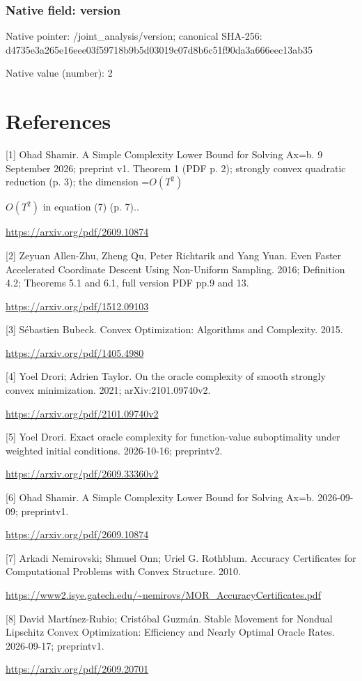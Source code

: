 \documentclass[10pt,a4paper]{article}
\newcommand{\AtlasMath}[1]{\par\begingroup\centering\setbox0=\hbox{$\displaystyle #1$}\ifdim\wd0>1.4\linewidth\typeout{ATLAS WIDE FORMULA: \the\wd0}\fi\ifdim\wd0>\linewidth\resizebox{\linewidth}{!}{\box0}\else\box0\fi\par\endgroup}
\newcommand{\AtlasInlineMath}[1]{\begingroup\setbox0=\hbox{$#1$}\ifdim\wd0>.4\linewidth\endgroup\AtlasMath{#1}\else\endgroup$#1$\fi}
\begin{document}
\subsubsection{Native field: version}
Native pointer: /joint\_\allowbreak{}analysis/version; canonical SHA-256: d4735e3a265e16eee03f59718b9b5d03019c07d8b6c51f90da3a666eec13ab35

Native value (number): 2

\section{References}
[1] Ohad Shamir. A Simple Complexity Lower Bound for Solving Ax=b. 9 September 2026; preprint v1. Theorem 1 (PDF p. 2); strongly convex quadratic reduction (p. 3); the dimension \AtlasInlineMath{O(T^2)} in equation (7) (p. 7)..

\url{https://arxiv.org/pdf/2609.10874}

[2] Zeyuan Allen-Zhu, Zheng Qu, Peter Richtarik and Yang Yuan. Even Faster Accelerated Coordinate Descent Using Non-Uniform Sampling. 2016; Definition 4.2; Theorems 5.1 and 6.1, full version PDF pp.9 and 13.

\url{https://arxiv.org/pdf/1512.09103}

[3] Sébastien Bubeck. Convex Optimization: Algorithms and Complexity. 2015.

\url{https://arxiv.org/pdf/1405.4980}

[4] Yoel Drori; Adrien Taylor. On the oracle complexity of smooth strongly convex minimization. 2021; arXiv:2101.09740v2.

\url{https://arxiv.org/pdf/2101.09740v2}

[5] Yoel Drori. Exact oracle complexity for function-value suboptimality under weighted initial conditions. 2026-10-16; preprintv2.

\url{https://arxiv.org/pdf/2609.33360v2}

[6] Ohad Shamir. A Simple Complexity Lower Bound for Solving Ax=b. 2026-09-09; preprintv1.

\url{https://arxiv.org/pdf/2609.10874}

[7] Arkadi Nemirovski; Shmuel Onn; Uriel G. Rothblum. Accuracy Certificates for Computational Problems with Convex Structure. 2010.

\url{https://www2.isye.gatech.edu/~nemirovs/MOR_AccuracyCertificates.pdf}

[8] David Martínez-Rubio; Cristóbal Guzmán. Stable Movement for Nondual Lipschitz Convex Optimization: Efficiency and Nearly Optimal Oracle Rates. 2026-09-17; preprintv1.

\url{https://arxiv.org/pdf/2609.20701}
\end{document}
